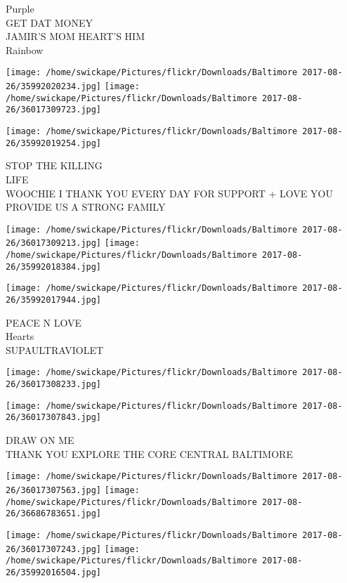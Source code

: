 \documentclass[10pt,letterpaper]{article}
\begin{document}
Purple\\
GET DAT MONEY\\
JAMIR'S MOM HEART'S HIM\\
Rainbow\\
\pagebreak

\texttt{[image: /home/swickape/Pictures/flickr/Downloads/Baltimore 2017-08-26/35992020234.jpg]}
\texttt{[image: /home/swickape/Pictures/flickr/Downloads/Baltimore 2017-08-26/36017309723.jpg]}

\vspace{0.25in}
\texttt{[image: /home/swickape/Pictures/flickr/Downloads/Baltimore 2017-08-26/35992019254.jpg]}

STOP THE KILLING\\
LIFE\\
WOOCHIE I THANK YOU EVERY DAY FOR SUPPORT + LOVE YOU PROVIDE US A STRONG FAMILY\\
\pagebreak

\texttt{[image: /home/swickape/Pictures/flickr/Downloads/Baltimore 2017-08-26/36017309213.jpg]}
\texttt{[image: /home/swickape/Pictures/flickr/Downloads/Baltimore 2017-08-26/35992018384.jpg]}

\texttt{[image: /home/swickape/Pictures/flickr/Downloads/Baltimore 2017-08-26/35992017944.jpg]}

PEACE N LOVE\\
Hearts\\
SUPAULTRAVIOLET\\
\pagebreak

\texttt{[image: /home/swickape/Pictures/flickr/Downloads/Baltimore 2017-08-26/36017308233.jpg]}

\vspace{0.25in}
\texttt{[image: /home/swickape/Pictures/flickr/Downloads/Baltimore 2017-08-26/36017307843.jpg]}

DRAW ON ME\\
THANK YOU EXPLORE THE CORE CENTRAL BALTIMORE\\
\pagebreak

\texttt{[image: /home/swickape/Pictures/flickr/Downloads/Baltimore 2017-08-26/36017307563.jpg]}
\texttt{[image: /home/swickape/Pictures/flickr/Downloads/Baltimore 2017-08-26/36686783651.jpg]}

\texttt{[image: /home/swickape/Pictures/flickr/Downloads/Baltimore 2017-08-26/36017307243.jpg]}
\texttt{[image: /home/swickape/Pictures/flickr/Downloads/Baltimore 2017-08-26/35992016504.jpg]}
\end{document}
